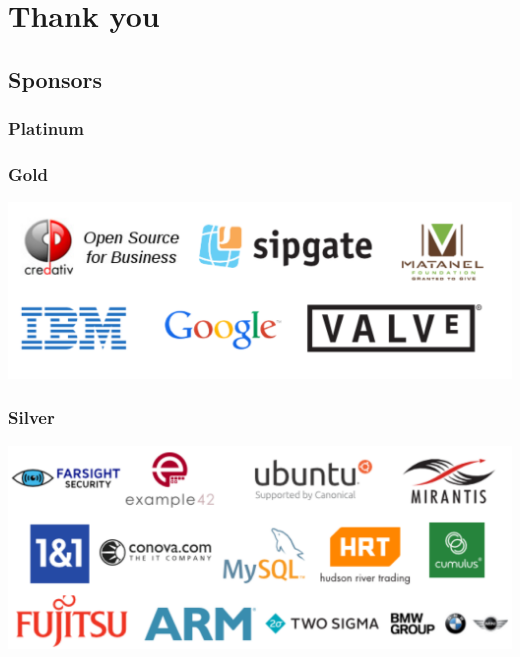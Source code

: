 \documentclass[t]{beamer}
\begin{document}
\section{Thank you}

\subsection{Sponsors}

\begin{frame}
	\frametitle{Platinum}
\end{frame}

\begin{frame}
	\frametitle{Gold}
	\begin{center}
	\includegraphics[scale=0.5]{images2/sponsors/gold.pdf}
	\end{center}

\end{frame}

\begin{frame}
	\frametitle{Silver}
	\begin{center}
	\includegraphics[scale=0.5]{images2/sponsors/silver.pdf}
	\end{center}

\end{frame}
\end{document}
